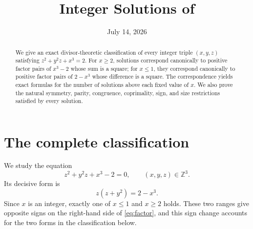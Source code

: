 \documentclass[11pt,a4paper]{amsart}
\title[Integer Solutions of a Cubic Equation]{Integer Solutions of \NoCaseChange{\texorpdfstring{$z^2+y^2z+x^3=2$}{z squared + y squared z + x cubed = 2}}}
\author{}
\date{July 14, 2026}
\theoremstyle{remark}
\newcommand{\Z}{\mathbb Z}
\begin{document}
\begin{abstract}
We give an exact divisor-theoretic classification of every integer triple $(x,y,z)$ satisfying $z^2+y^2z+x^3=2$.  For $x\geq 2$, solutions correspond canonically to positive factor pairs of $x^3-2$ whose sum is a square; for $x\leq 1$, they correspond canonically to positive factor pairs of $2-x^3$ whose difference is a square.  The correspondence yields exact formulas for the number of solutions above each fixed value of $x$.  We also prove the natural symmetry, parity, congruence, coprimality, sign, and size restrictions satisfied by every solution.
\end{abstract}

\maketitle

\section{The complete classification}

We study the equation
\begin{equation}\label{eq:main}
 z^2+y^2z+x^3-2=0,
 \qquad (x,y,z)\in\Z^3.
\end{equation}
Its decisive form is
\begin{equation}\label{eq:factor}
 z(z+y^2)=2-x^3.
\end{equation}
Since $x$ is an integer, exactly one of $x\leq 1$ and $x\geq 2$ holds.  These two ranges give opposite signs on the right-hand side of \eqref{eq:factor}, and this sign change accounts for the two forms in the classification below.
\end{document}
